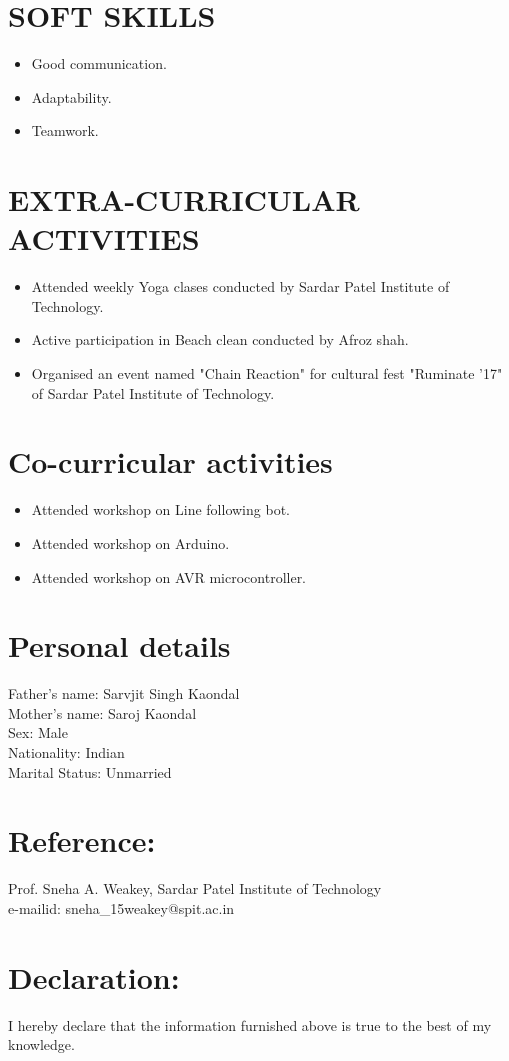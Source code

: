 \documentclass{article}
\begin{document}
\section*{\textbf{SOFT SKILLS}}
\begin{itemize}
\item Good communication.
\item Adaptability.
\item Teamwork.
\end{itemize}


\section*{\textbf{EXTRA-CURRICULAR ACTIVITIES}}
\begin{itemize}
\item Attended weekly Yoga clases conducted by Sardar Patel Institute of Technology. 
\item Active participation in Beach clean conducted by Afroz shah.
\item Organised an event named "Chain Reaction" for cultural fest "Ruminate '17" of Sardar Patel Institute of Technology.
\end{itemize}


\section*{\textbf{Co-curricular activities}}
\begin{itemize}
\item Attended workshop on Line following bot.
\item Attended workshop on Arduino.
\item Attended workshop on AVR microcontroller.
\end{itemize}


\section*{\textbf{Personal details}}
Father's name: Sarvjit Singh Kaondal\\
Mother's name: Saroj Kaondal\\
Sex: Male\\
Nationality: Indian\\
Marital Status: Unmarried


\section*{\normalsize{\textbf{Reference:}}}
\noindent 
Prof. Sneha A. Weakey, Sardar Patel Institute of Technology \\e-mailid: sneha\_15weakey@spit.ac.in


\section*{\textbf{\normalsize{Declaration:}}}
\noindent
 I hereby declare that the information furnished above is true to the best of my knowledge.
\end{document}

